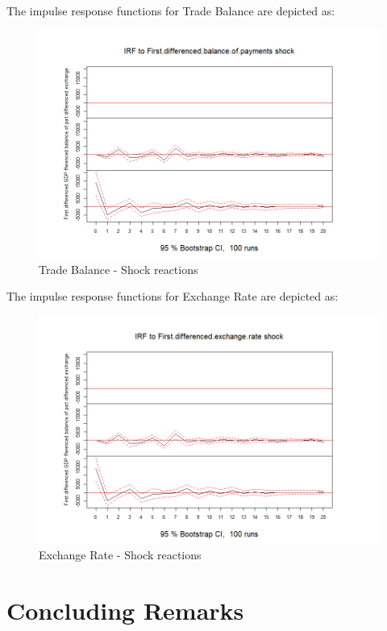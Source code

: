 \documentclass[
]{article}
\begin{document}
The impulse response functions for Trade Balance are depicted as:

\begin{figure}

{\centering \includegraphics[width=0.8\linewidth]{../results/IRF_plots2/IRF_to_First.differenced.balance.of.payments} 

}

\caption{Trade Balance - Shock reactions}\label{fig:unnamed-chunk-28}
\end{figure}

The impulse response functions for Exchange Rate are depicted as:

\begin{figure}

{\centering \includegraphics[width=0.8\linewidth]{../results/IRF_plots2/IRF_to_First.differenced.exchange.rate} 

}

\caption{Exchange Rate - Shock reactions}\label{fig:unnamed-chunk-29}
\end{figure}

\section{Concluding Remarks}
\end{document}
